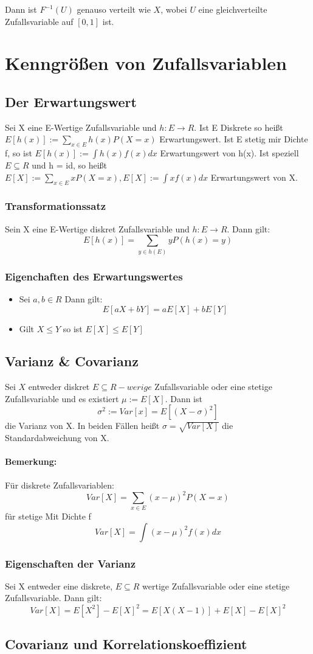 \documentclass{report}
\begin{document}
Dann ist \(F^{-1}(U)\) genauso verteilt wie \(X\), wobei \(U\) eine gleichverteilte Zufallsvariable auf \([0, 1]\) ist.

\chapter*{Kenngrößen von Zufallsvariablen}
\section*{Der Erwartungswert}
Sei X eine E-Wertige Zufallsvariable und $h:E \rightarrow R$. Ist E Diskrete so heißt $E[h(x)] := \sum_{x \in E} h(x)P(X = x)$ Erwartungswert. Ist E stetig mir Dichte f, so ist $E[h(x)] := \int h(x)f(x)dx$ Erwartungswert von h(x).
Ist speziell $E \subseteq R$ und h = id, so heißt $E[X] := \sum_{x \in E} xP(X=x), E[X]:= \int xf(x)dx$ Erwartungswert von X.
\subsection*{Transformationssatz}
Sein X eine E-Wertige diskret Zufallsvariable und $h : E \rightarrow R$. Dann gilt: \[E[h(x)] = \sum_{y \in h(E)} yP(h(x) = y)\]
\subsection*{Eigenchaften des Erwartungswertes}
\begin{itemize}
    \item {Sei $a, b \in R$ Dann gilt: \[E[aX+bY] = aE[X]+bE[Y]\]}
    \item {Gilt $X\leq Y$ so ist $E[X]\leq E[Y]$}
\end{itemize}
\section*{Varianz \& Covarianz}
Sei $X$ entweder diskret $E \subseteq R-werige$ Zufallsvariable oder eine stetige Zufallsvariable und es existiert $\mu := E[X]$. Dann ist \[\sigma^2 := Var[x] = E[(X-\sigma)^2]\]
die Varianz von X. In beiden Fällen heißt $\sigma = \sqrt{Var[X]}$ die Standardabweichung von X. 
\subsubsection*{Bemerkung:}
Für diskrete Zufallsvariablen: \[Var[X] = \sum_{x \in E}(x-\mu)^2P(X=x)\]
für stetige Mit Dichte f \[Var[X] = \int(x-\mu)^2f(x)dx\]
\subsection*{Eigenschaften der Varianz}
Sei X entweder eine diskrete, $E \subseteq R$ wertige Zufallsvariable oder eine stetige Zufallsvariable. Dann gilt: \[Var[X] = E[X^2] - E[X]^2 = E[X(X - 1)] + E[X] - E[X]^2\]
\section*{Covarianz und Korrelationskoeffizient}
\end{document}
